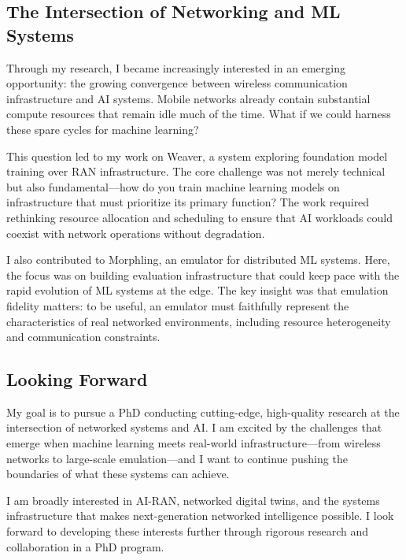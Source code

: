 \documentclass[letterpaper,11pt]{article}
\begin{document}
\subsection*{The Intersection of Networking and ML Systems}

Through my research, I became increasingly interested in an emerging opportunity: the growing convergence between wireless communication infrastructure and AI systems. Mobile networks already contain substantial compute resources that remain idle much of the time. What if we could harness these spare cycles for machine learning?

This question led to my work on Weaver, a system exploring foundation model training over RAN infrastructure. The core challenge was not merely technical but also fundamental---how do you train machine learning models on infrastructure that must prioritize its primary function? The work required rethinking resource allocation and scheduling to ensure that AI workloads could coexist with network operations without degradation.

I also contributed to Morphling, an emulator for distributed ML systems. Here, the focus was on building evaluation infrastructure that could keep pace with the rapid evolution of ML systems at the edge. The key insight was that emulation fidelity matters: to be useful, an emulator must faithfully represent the characteristics of real networked environments, including resource heterogeneity and communication constraints.

\subsection*{Looking Forward}

My goal is to pursue a PhD conducting cutting-edge, high-quality research at the intersection of networked systems and AI. I am excited by the challenges that emerge when machine learning meets real-world infrastructure---from wireless networks to large-scale emulation---and I want to continue pushing the boundaries of what these systems can achieve.

I am broadly interested in AI-RAN, networked digital twins, and the systems infrastructure that makes next-generation networked intelligence possible. I look forward to developing these interests further through rigorous research and collaboration in a PhD program.
\end{document}
